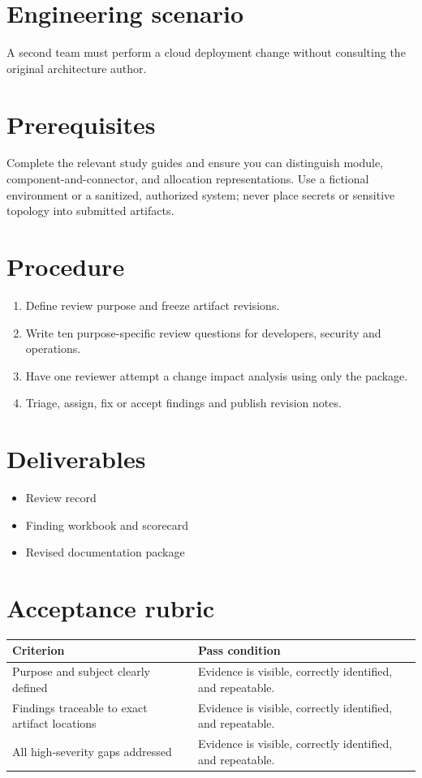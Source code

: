 \documentclass[10pt,letterpaper]{article}
\begin{document}
\DocProvenance
\section{Engineering scenario}
A second team must perform a cloud deployment change without consulting the original architecture author.

\section{Prerequisites}
Complete the relevant study guides and ensure you can distinguish module, component-and-connector, and allocation representations. Use a fictional environment or a sanitized, authorized system; never place secrets or sensitive topology into submitted artifacts.

\section{Procedure}
\begin{enumerate}
\item Define review purpose and freeze artifact revisions.
\item Write ten purpose-specific review questions for developers, security and operations.
\item Have one reviewer attempt a change impact analysis using only the package.
\item Triage, assign, fix or accept findings and publish revision notes.
\end{enumerate}
\section{Deliverables}
\begin{itemize}
\item Review record
\item Finding workbook and scorecard
\item Revised documentation package
\end{itemize}
\section{Acceptance rubric}
\small
\begin{tabularx}{\linewidth}{@{}YY@{}}
\toprule
\textbf{Criterion} & \textbf{Pass condition} \\
\midrule
Purpose and subject clearly defined & Evidence is visible, correctly identified, and repeatable. \\
Findings traceable to exact artifact locations & Evidence is visible, correctly identified, and repeatable. \\
All high-severity gaps addressed & Evidence is visible, correctly identified, and repeatable. \\
\bottomrule
\end{tabularx}
\normalsize
\end{document}
